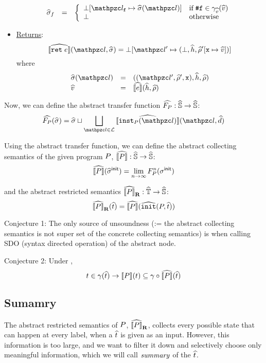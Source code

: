 \begin{itemize}
\[\begin{array}{lcl}
        \astate_f &=& \left\{
          \begin{array}{ll}
            \bot[\lab_\varf \mapsto \astate(\lab)] & \text{if} \; \false \in
            \avalgamma(\aval)\\
            \bot & \text{otherwise}\\
          \end{array}
        \right.\\
      \end{array}
    \]

  \item \underline{Returns}:
    \[
      \asem{\kwret \; \expr}(\lab, \astate) =
      \bot[\lab' \mapsto (\bot, \aheap, \aenv'[\varx \mapsto \aval])]
    \]
    where
    \[
      \begin{array}{lcl}
        \astate(\lab) &=& ((\lab', \aenv', \varx), \aheap, \aenv)\\
        \aval &=& \asem{\expr}(\aheap, \aenv)\\
      \end{array}
    \]
\end{itemize}

Now, we can define the abstract transfer function
$\widehat{F_{P}}: \widehat{\mathbb{S}} \rightarrow \widehat{\mathbb{S}} $:
\[
  \atransfer{\prog}(\astate) =
    \astate \join
    \bigjoin_{\lab \in \labset}{\asem{\getinst{\prog}(\lab)}(\lab, \aelem)}
\]

Using the abstract transfer function, we can define the
abstract collecting semantics of the given program $P$,
$\widehat{\llbracket{P}\rrbracket}: \widehat{\mathbb{S}} \rightarrow \widehat{\mathbb{S}}$:
\[
  \widehat{\llbracket{P}\rrbracket}(\widehat{\sigma}^{\textsf{init}}) = \lim_{n \rightarrow \infty}F_{P}^n( \sigma^{\textsf{init}} ) \\
\]

and the abstract restricted semantics
$\widehat{\llbracket{P}\rrbracket}_\textbf{R}: \widehat{\mathbb{T}} \rightarrow \widehat{\mathbb{S}}$:
\[
  \rasem{\prog}(\atree) = \asem{\prog}( \abs{\getinitst}(\prog, \atree) ) \\
\]

Conjecture 1:
The only source of unsoundness (:= the abstract collecting semantics is not super set of
the concrete collecting semantics) is when calling SDO (syntax directed operation) of the abstract node.

Conjecture 2:
Under ,
\[
  t \in \gamma(\widehat{t}) \rightarrow \llbracket{P}\rrbracket(t) \subseteq \gamma \circ \widehat{\llbracket{P}\rrbracket}(\widehat{t})
\]

\subsection{Sumamry}
The abstract restricted semantics of $P$, $\widehat{\llbracket{P}\rrbracket}_\textbf{R}$, collects every possible state
that can happen at every label, when a $\widehat{t}$ is given as an input.
However, this information is too large, and we want to
filter it down and selectively choose only meaningful information, which we will call $\it{summary}$ of
the $\widehat{t}$.

